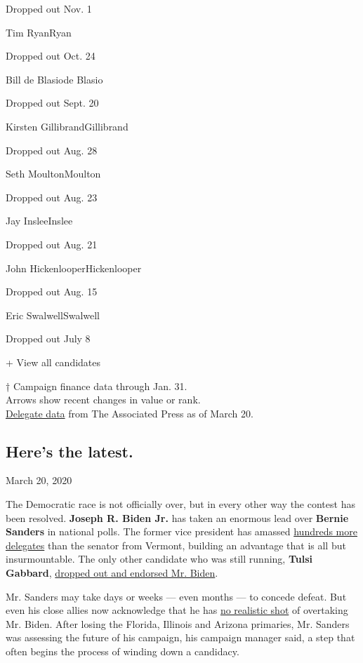 Dropped out Nov. 1

Tim RyanRyan

Dropped out Oct. 24

Bill de Blasiode Blasio

Dropped out Sept. 20

Kirsten GillibrandGillibrand

Dropped out Aug. 28

Seth MoultonMoulton

Dropped out Aug. 23

Jay InsleeInslee

Dropped out Aug. 21

John HickenlooperHickenlooper

Dropped out Aug. 15

Eric SwalwellSwalwell

Dropped out July 8

+ View all candidates

† Campaign finance data through Jan. 31.\\
Arrows show recent changes in value or rank.\\
\href{https://www.nytimes3xbfgragh.onion/interactive/2020/us/elections/delegate-count-primary-results.html}{Delegate
data} from The Associated Press as of March 20.

\hypertarget{heres-the-latest}{%
\subsection{Here's the latest.}\label{heres-the-latest}}

March 20, 2020

The Democratic race is not officially over, but in every other way the
contest has been resolved. \textbf{Joseph R. Biden Jr.} has taken an
enormous lead over \textbf{Bernie Sanders} in national polls. The former
vice president has amassed
\href{https://www.nytimes3xbfgragh.onion/interactive/2020/us/elections/delegate-count-primary-results.html}{hundreds
more delegates} than the senator from Vermont, building an advantage
that is all but insurmountable. The only other candidate who was still
running, \textbf{Tulsi Gabbard},
\href{https://www.nytimes3xbfgragh.onion/2020/03/19/us/politics/tulsi-gabbard-drops-out.html}{dropped
out and endorsed Mr. Biden}.

Mr. Sanders may take days or weeks --- even months --- to concede
defeat. But even his close allies now acknowledge that he has
\href{https://www.nytimes3xbfgragh.onion/2020/03/18/us/politics/bernie-sanders-campaign.html}{no
realistic shot} of overtaking Mr. Biden. After losing the Florida,
Illinois and Arizona primaries, Mr. Sanders was assessing the future of
his campaign, his campaign manager said, a step that often begins the
process of winding down a candidacy.


